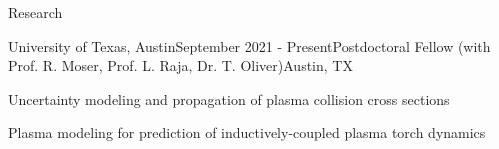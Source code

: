 \documentclass{resume} %
\begin{document}
\begin{rSection}{Research}

\begin{rSubsection}{University of Texas, Austin}{September 2021 - Present}{Postdoctoral Fellow \textnormal{(with Prof. R. Moser, Prof. L. Raja, Dr. T. Oliver)}}{Austin, TX}
\item Uncertainty modeling and propagation of plasma collision cross sections
\item Plasma modeling for prediction of inductively-coupled plasma torch dynamics
\end{rSubsection}


\end{rSection}
\end{document}
